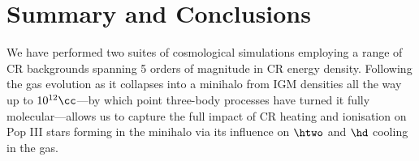 \section{Summary and Conclusions}
\label{conclusions}

We have performed two suites of cosmological simulations employing a range of CR backgrounds spanning 5 orders of magnitude in CR energy density. 
Following the gas evolution as it collapses into a minihalo from IGM densities all the way up to $10^{12}\cc$---by which point three-body processes have turned it fully molecular---allows us to capture the full impact of CR heating and ionisation on Pop III stars forming in the minihalo via its influence on $\htwo$ and $\hd$ cooling in the gas.